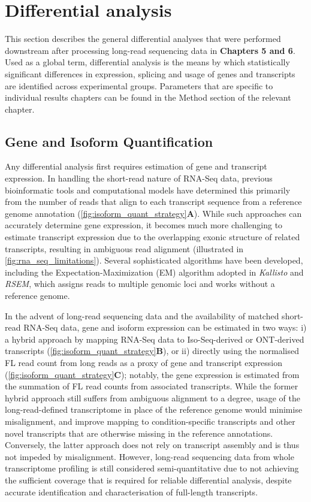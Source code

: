 \section{Differential analysis}

This section describes the general differential analyses that were performed downstream after processing long-read sequencing data in \textbf{Chapters 5 and 6}. Used as a global term, differential analysis is the means by which statistically significant differences in expression, splicing and usage of genes and transcripts are identified across experimental groups. Parameters that are specific to individual results chapters can be found in the Method section of the relevant chapter. 

\subsection{Gene and Isoform Quantification}\label{sec: gene_isoform_quant_explained}
Any differential analysis first requires estimation of gene and transcript expression. In handling the short-read nature of RNA-Seq data, previous bioinformatic tools and computational models have determined this primarily from the number of reads that align to each transcript sequence from a reference genome annotation\cite{Conesa2016} (\cref{fig:isoform_quant_strategy}\textbf{A}). While such approaches can accurately determine gene expression, it becomes much more challenging to estimate transcript expression due to the overlapping exonic structure of related transcripts, resulting in ambiguous read alignment (illustrated in \cref{fig:rna_seq_limitations}). Several sophisticated algorithms have been developed, including the Expectation-Maximization (EM) algorithm adopted in \textit{Kallisto}\cite{Bray2016} and \textit{RSEM}\cite{Li2011}, which assigns reads to multiple genomic loci and works without a reference genome\cite{Conesa2016}. 

In the advent of long-read sequencing data and the availability of matched short-read RNA-Seq data, gene and isoform expression can be estimated in two ways: i) a hybrid approach by mapping RNA-Seq data to Iso-Seq-derived or ONT-derived transcripts (\cref{fig:isoform_quant_strategy}\textbf{B}), or ii) directly using the normalised FL read count from long reads as a proxy of gene and transcript expression (\cref{fig:isoform_quant_strategy}\textbf{C}); notably, the gene expression is estimated from the summation of FL read counts from associated transcripts. While the former hybrid approach still suffers from ambiguous alignment to a degree, usage of the long-read-defined transcriptome in place of the reference genome would minimise misalignment, and improve mapping to condition-specific transcripts and other novel transcripts that are otherwise missing in the reference annotations\cite{Au2013}. Conversely, the latter approach does not rely on transcript assembly and is thus not impeded by misalignment. However, long-read sequencing data from whole transcriptome profiling is still considered semi-quantitative due to not achieving the sufficient coverage that is required for reliable differential analysis, despite accurate identification and characterisation of full-length transcripts.  

